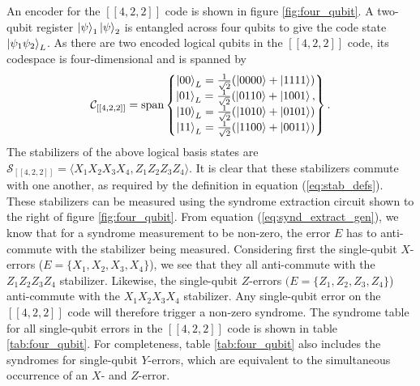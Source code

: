 \documentclass[]{arxiv}
\theoremstyle{plain}%
\theoremstyle{definition}
\theoremstyle{remark}
\begin{document}
An encoder for the $[[4,2,2]]$ code is shown in figure \ref{fig:four_qubit}. A two-qubit register $\ket{\psi}_1\ket{\psi}_2$ is entangled across four qubits to give the code state $\ket{\psi_1 \psi_2}_L$. As there are two encoded logical qubits in the $[[4,2,2]]$ code, its codespace is four-dimensional and is spanned by
%
\begin{equation}
\mathcal{C}_{[[4,2,2]]} = {\rm span}\left\{ \begin{matrix}
\ket{00}_L=\frac{1}{\sqrt{2}}(\ket{0000}+\ket{1111})\\
\ket{01}_L=\frac{1}{\sqrt{2}}(\ket{0110}+\ket{1001},\\
\ket{10}_L=\frac{1}{\sqrt{2}}(\ket{1010}+\ket{0101})\\
\ket{11}_L=\frac{1}{\sqrt{2}}(\ket{1100}+\ket{0011})
\end{matrix}
\right\}\rm.
\end{equation}
%
The stabilizers of the above logical basis states are $\mathcal{S}_{[[4,2,2]]} = \langle X_1X_2X_3X_4,Z_1Z_2Z_3Z_4 \rangle$. It is clear that these stabilizers commute with one another, as required by the definition in equation (\ref{eq:stab_defs}). These stabilizers can be measured using the syndrome extraction circuit shown to the right of figure \ref{fig:four_qubit}. From equation (\ref{eq:synd_extract_gen}), we know that for a syndrome measurement to be non-zero, the error $E$ has to anti-commute with the stabilizer being measured. Considering first the single-qubit $X$-errors ($E=\{X_1,X_2,X_3,X_4\}$), we see that they all anti-commute with the $Z_1Z_2Z_3Z_4$ stabilizer. Likewise, the single-qubit $Z$-errors $(E=\{Z_1,Z_2,Z_3,Z_4\}$) anti-commute with the $X_1X_2X_3X_4$ stabilizer. Any single-qubit error on the $[[4,2,2]]$ code will therefore trigger a non-zero syndrome. The syndrome table for all single-qubit errors in the $[[4,2,2]]$ code is shown in table \ref{tab:four_qubit}. For completeness, table \ref{tab:four_qubit} also includes the syndromes for single-qubit $Y$-errors, which are equivalent to the simultaneous occurrence of an $X$- and $Z$-error.
\end{document}
